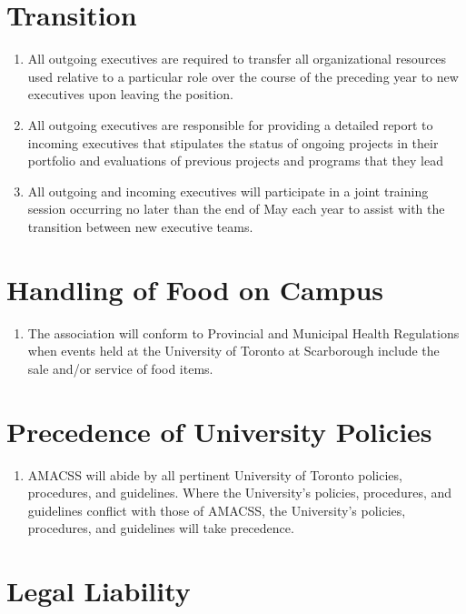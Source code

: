 \documentclass[12pt,a4paper]{article}
\begin{document}
\section{Transition}

\begin{enumerate}
\item All outgoing executives are required to transfer all organizational resources used relative to a particular role over the course of the preceding year to new executives upon leaving the position.

\item All outgoing executives are responsible for providing a detailed report to incoming executives that stipulates the status of ongoing projects in their portfolio and evaluations of previous projects and programs that they lead

\item All outgoing and incoming executives will participate in a joint training session occurring no later than the end of May each year to assist with the transition between new executive teams.
\end{enumerate}

\section{Handling of Food on Campus}

\begin{enumerate}
\item The association will conform to Provincial and Municipal Health Regulations when events held at the University of Toronto at Scarborough include the sale and/or service of food items.
\end{enumerate}

\section{Precedence of University Policies}

\begin{enumerate}
\item AMACSS will abide by all pertinent University of Toronto policies, procedures, and guidelines. Where the University's policies, procedures, and guidelines conflict with those of AMACSS, the University's policies, procedures, and guidelines will take precedence.
\end{enumerate}

\section{Legal Liability}
\end{document}
